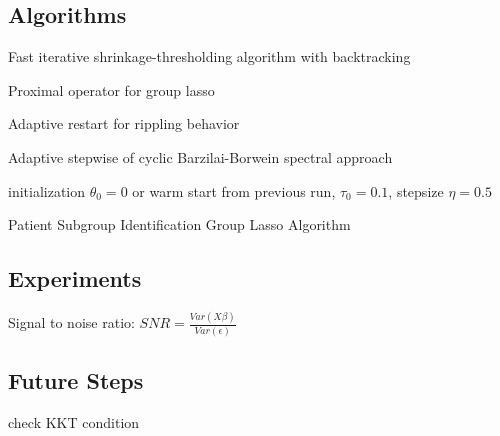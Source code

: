 \documentclass[12pt]{article}
\begin{document}
\subsection*{Algorithms}

Fast iterative shrinkage-thresholding algorithm with backtracking \cite{beck2009fast}

Proximal operator for group lasso \cite{liu2010fast}

Adaptive restart for rippling behavior \cite{o2015adaptive}

Adaptive stepwise of cyclic Barzilai-Borwein spectral approach \cite{wright2009sparse}




\begin{algorithm}[H]
  initialization $\theta_0=0$ or warm start from previous run, $\tau_0=0.1$, stepsize $\eta=0.5$\;
  \caption{Patient Subgroup Identification Group Lasso Algorithm}
 \end{algorithm}
 

\subsection*{Experiments}

Signal to noise ratio: $SNR=\frac{Var(X\beta)}{Var(\epsilon)}$


\subsection*{Future Steps}

check KKT condition

\end{document}
